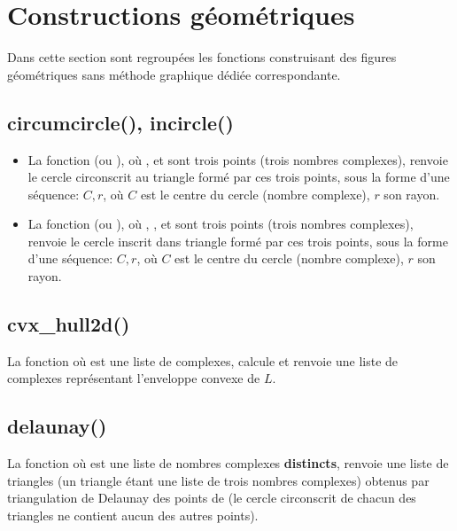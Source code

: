\section{Constructions géométriques}

Dans cette section sont regroupées les fonctions construisant des figures géométriques sans méthode graphique dédiée correspondante.

\subsection{circumcircle(), incircle()}

\begin{itemize}
    \item La fonction  (ou ), où ,  et  sont trois points (trois nombres complexes), renvoie le cercle circonscrit au triangle formé par ces trois points, sous la forme d'une séquence: $C,r$, où $C$ est le centre du cercle (nombre complexe), $r$ son rayon.
    \item La fonction  (ou ), où , , et  sont trois points (trois nombres complexes), renvoie le cercle inscrit dans triangle formé par ces trois points, sous la forme d'une séquence: $C,r$, où $C$ est le centre du cercle (nombre complexe), $r$ son rayon.    
\end{itemize}

\subsection{cvx\_hull2d()}

La fonction  où  est une liste de complexes, calcule et renvoie une liste de complexes représentant l'enveloppe convexe de $L$.

\subsection{delaunay()}

La fonction  où  est une liste de nombres complexes \textbf{distincts}, renvoie une liste de triangles (un triangle étant une liste de trois nombres complexes) obtenus par triangulation de Delaunay des points de  (le cercle circonscrit de chacun des triangles ne contient aucun des autres points).

